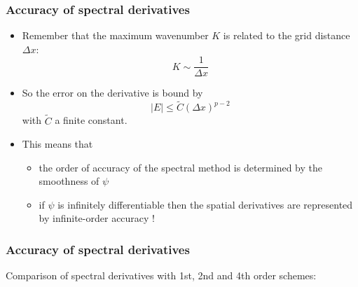 \documentclass[aspectratio=149,9pt]{beamer}
\begin{document}
\begin{frame}
	\frametitle{Accuracy of spectral derivatives}
	\vfill\begin{itemize}
		\item Remember that the maximum wavenumber $K$ is related to the grid distance $\Delta x$:
			\begin{equation*}
				K\sim\frac{1}{\Delta x}
			\end{equation*}\vfill
		\item So the error on the derivative is bound by
			\begin{equation*}
				\vert E \vert \le \tilde C \left( \Delta x \right)^{p-2}
			\end{equation*}
			with $\tilde C$ a finite constant.\vfill
		\item This means that\vfill
			\begin{itemize}
				 \item the order of accuracy of the spectral method is determined by the smoothness of $\psi$
				 \item if $\psi$ is infinitely differentiable then the spatial derivatives are represented by infinite-order accuracy !
			\end{itemize}
	\end{itemize}\vfill
\end{frame}
%
%
\begin{frame}
	\frametitle{Accuracy of spectral derivatives}
	\par
	Comparison of spectral derivatives with 1st, 2nd and 4th order schemes:
	\begin{center}
		\scalebox{.95}{\small}
	\end{center}
\end{frame}
%
%
\end{document}
